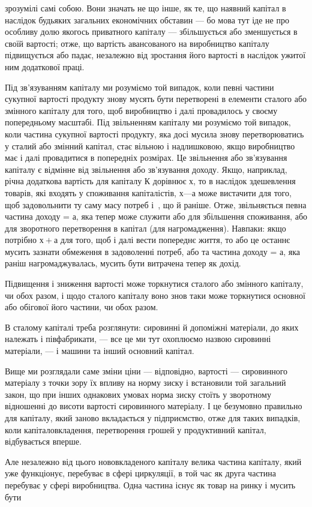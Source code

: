 \parcont{}  %
зрозумілі самі собою. Вони значать не що інше, як те, що наявний
капітал в наслідок будьяких загальних економічних обставин
— бо мова тут іде не про особливу долю якогось приватного
капіталу — збільшується або зменшується в своїй вартості;
отже, що вартість авансованого на виробництво капіталу
підвищується або падає, незалежно від зростання його вартості
в наслідок ужитої ним додаткової праці.

Під зв’язуванням капіталу ми розуміємо той випадок, коли
певні частини сукупної вартості продукту знову мусять бути
перетворені в елементи сталого або змінного капіталу для
того, щоб виробництво і далі провадилось у своєму попередньому
масштабі. Під звільненням капіталу ми розуміємо той
випадок, коли частина сукупної вартості продукту, яка досі
мусила знову перетворюватись у сталий або змінний капітал,
стає вільною і надлишковою, якщо виробництво має і далі провадитися
в попередніх розмірах. Це звільнення або зв’язування
капіталу є відмінне від звільнення або зв’язування доходу. Якщо,
наприклад, річна додаткова вартість для капіталу $К$ дорівнює
$х$, то в наслідок здешевлення товарів, які входять у споживання
капіталістів, $х — а$ може вистачити для того, щоб задовольнити
ту саму масу потреб і~, що й раніше. Отже,
звільняється певна частина доходу = $а$, яка тепер може служити
або для збільшення споживання, або для зворотного перетворення
в капітал (для нагромадження). Навпаки: якщо потрібно
$х + а$ для того, щоб і далі вести попереднє життя, то або це
останнє мусить зазнати обмеження в задоволенні потреб, або
та частина доходу = $а$, яка раніш нагромаджувалась, мусить бути
витрачена тепер як дохід.

Підвищення і зниження вартості може торкнутися сталого
або змінного капіталу, чи обох разом, і щодо сталого капіталу
воно знов таки може торкнутися основної або обігової його
частини, чи обох разом.

В сталому капіталі треба розглянути: сировинні й допоміжні
матеріали, до яких належать і півфабрикати, — все це ми тут
охоплюємо назвою сировинні матеріали, — і машини та інший
основний капітал.

Вище ми розглядали саме зміни ціни — відповідно, вартості —
сировинного матеріалу з точки зору їх впливу на норму зиску
і встановили той загальний закон, що при інших однакових умовах
норма зиску стоїть у зворотному відношенні до висоти вартості
сировинного матеріалу. І це безумовно правильно для
капіталу, який заново вкладається у підприємство, отже для
таких випадків, коли капіталовкладення, перетворення грошей
у продуктивний капітал, відбувається вперше.

Але незалежно від цього нововкладеного капіталу велика
частина капіталу, який уже функціонує, перебуває в сфері
циркуляції, в той час як друга частина перебуває у сфері виробництва.
Одна частина існує як товар на ринку і мусить бути
\parbreak{}  %
